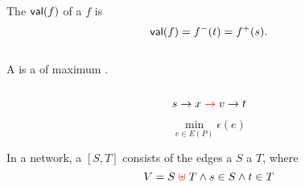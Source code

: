 \begin{frame}{}
  \begin{definition}[Value (值)]
    The  $\textsf{val}(f)$ of a  $f$ is
    \[
      \textsf{val}(f) = f^{-}(t) = f^{+}(s).
    \]
  \end{definition}

  \vspace{0.30cm}
  \begin{columns}
      \pause
  \end{columns}

  \pause
  \vspace{0.50cm}
  \begin{definition}
    A  is a  of maximum .
  \end{definition}
\end{frame}

\begin{frame}{}
  \begin{columns}
  \end{columns}

  \pause
  \vspace{0.30cm}
  \[
    s \to x \;\textcolor{red}{\to}\; v \to t
  \]

  \pause
  \begin{definition}
    \[
      \min_{e \in E(P)} \epsilon(e)
    \]
  \end{definition}
\end{frame}

\begin{frame}{}
  \begin{definition}
    In a network, a  $[S, T]$
    consists of the edges  a  $S$
     a  $T$, where
    \[
      V = S \;\textcolor{red}{\uplus}\; T \land s \in S \land t \in T
    \]
  \end{definition}

  \vspace{0.50cm}
\end{frame}

